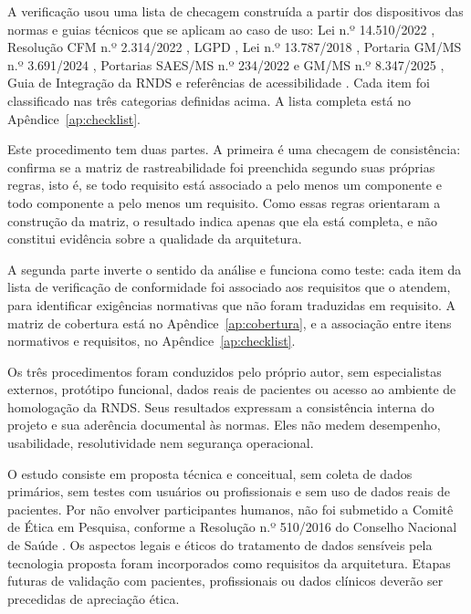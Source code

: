 
A verificação usou uma lista de checagem construída a partir dos dispositivos das normas e guias técnicos que se aplicam ao caso de uso: Lei n.º 14.510/2022 \cite{lei14510}, Resolução CFM n.º 2.314/2022 \cite{cfm2314}, LGPD \cite{lgpd2018}, Lei n.º 13.787/2018 \cite{lei13787}, Portaria GM/MS n.º 3.691/2024 \cite{portaria3691}, Portarias SAES/MS n.º 234/2022 e GM/MS n.º 8.347/2025 \cite{portaria234, portaria8347}, Guia de Integração da RNDS \cite{rndsconector, rndsambientes, rndserros} e referências de acessibilidade \cite{lbi2015, nbr9050, emag, wcag21}. Cada item foi classificado nas três categorias definidas acima. A lista completa está no Apêndice~\ref{ap:checklist}.


Este procedimento tem duas partes. A primeira é uma checagem de consistência: confirma se a matriz de rastreabilidade foi preenchida segundo suas próprias regras, isto é, se todo requisito está associado a pelo menos um componente e todo componente a pelo menos um requisito. Como essas regras orientaram a construção da matriz, o resultado indica apenas que ela está completa, e não constitui evidência sobre a qualidade da arquitetura.

A segunda parte inverte o sentido da análise e funciona como teste: cada item da lista de verificação de conformidade foi associado aos requisitos que o atendem, para identificar exigências normativas que não foram traduzidas em requisito. A matriz de cobertura está no Apêndice~\ref{ap:cobertura}, e a associação entre itens normativos e requisitos, no Apêndice~\ref{ap:checklist}.


Os três procedimentos foram conduzidos pelo próprio autor, sem especialistas externos, protótipo funcional, dados reais de pacientes ou acesso ao ambiente de homologação da RNDS. Seus resultados expressam a consistência interna do projeto e sua aderência documental às normas. Eles não medem desempenho, usabilidade, resolutividade nem segurança operacional.

\label{sec:met-etica}

O estudo consiste em proposta técnica e conceitual, sem coleta de dados primários, sem testes com usuários ou profissionais e sem uso de dados reais de pacientes. Por não envolver participantes humanos, não foi submetido a Comitê de Ética em Pesquisa, conforme a Resolução n.º 510/2016 do Conselho Nacional de Saúde \cite{cns510}. Os aspectos legais e éticos do tratamento de dados sensíveis pela tecnologia proposta foram incorporados como requisitos da arquitetura. Etapas futuras de validação com pacientes, profissionais ou dados clínicos deverão ser precedidas de apreciação ética.


